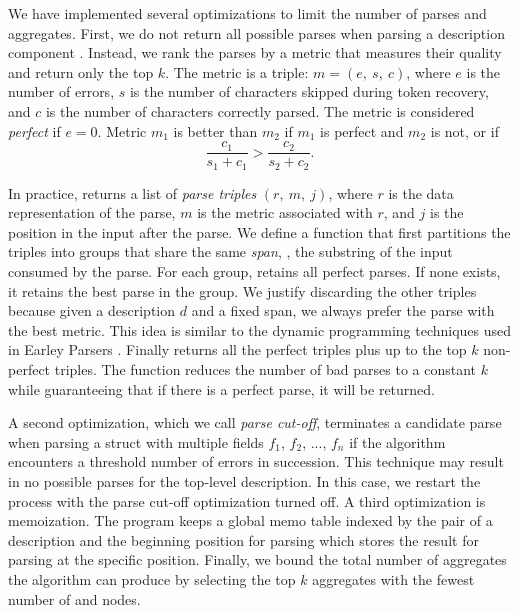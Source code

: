 We have implemented several optimizations to limit the number of 
parses and aggregates. First, we do not return all possible
parses when parsing a description component . 
Instead, we rank the parses by a metric that
measures their quality and return only the top $k$. The metric is
a triple: 
$m = (e,~ s,~ c)$,
where $e$ is the number of errors, $s$ is the number of 
characters skipped during  token recovery, and $c$ is the number
of characters correctly parsed. The metric is considered \textit{perfect} if $e = 0$.
Metric $m_1$ is better than $m_2$ if $m_1$ is perfect and $m_2$ is not, or
if 
\[\frac{c_1}{s_1+c_1} > \frac{c_2}{s_2 + c_2}.\]

In practice,  returns a list of
{\em parse triples} $(r,~m,~j)$, where $r$ is the data representation of
the parse, $m$ is the metric associated with $r$, and
$j$ is the position in the input after the parse.
We define a  function that first partitions the
triples into groups that share the same 
{\em span}, \ie{}, the substring of the input consumed by the parse.
For each group,  retains all perfect parses. If 
none exists, it retains the best parse in the group. 
We justify discarding the other triples because
given a description $d$ and a fixed span, we always
prefer the parse with the best metric. This idea is
similar to the dynamic programming techniques used in 
Earley Parsers \cite{earley-parser}. Finally  returns all
the perfect triples plus up to the top $k$ non-perfect triples.
The  function reduces the number of bad parses 
to a constant $k$ while guaranteeing that if there is a
perfect parse, it will be returned. 

A second optimization, which we call {\em parse cut-off}, terminates a
candidate parse when parsing a struct with multiple
fields $f_1$, $f_2$, ..., $f_n$ if the algorithm encounters 
a threshold number of errors in succession. 
This technique may result in no possible parses for the
top-level description.  In this case, we restart the process
with the parse cut-off optimization turned off. 
A third optimization is memoization.
The program keeps a global memo table indexed by the pair of a
description  and the beginning position for parsing  which
stores the result for parsing  at the specific position.
Finally, we bound the total number of aggregates the
algorithm can produce by selecting the top
$k$ aggregates with the fewest number of  and 
nodes. 


